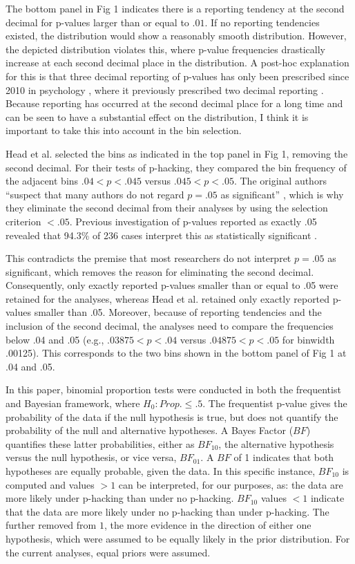 The bottom panel in Fig 1 indicates there is a reporting tendency at the second decimal for p-values larger than or equal to $.01$. If no reporting tendencies existed, the distribution would show a reasonably smooth distribution. However, the depicted distribution violates this, where p-value frequencies drastically increase at each second decimal place in the distribution. A post-hoc explanation for this is that three decimal reporting of p-values has only been prescribed since 2010 in psychology \cite{American_Psychological_Association2010-qe}, where it previously prescribed two decimal reporting \cite{American_Psychological_Association1983-yf, American_Psychological_Association2001-uw}. Because reporting has occurred at the second decimal place for a long time and can be seen to have a substantial effect on the distribution, I think it is important to take this into account in the bin selection.

Head et al. selected the bins as indicated in the top panel in Fig 1, removing the second decimal. For their tests of p-hacking, they compared the bin frequency of the adjacent bins $.04<p<.045$ versus $.045<p<.05$. The original authors “suspect that many authors do not regard $p=.05$ as significant” \cite{Head_2015}, which is why they eliminate the second decimal from their analyses by using the selection criterion $<.05$. Previous investigation of p-values reported as exactly .05 revealed that 94.3\% of 236 cases interpret this as statistically significant \cite{Nuijten2015}.

This contradicts the premise that most researchers do not interpret $p=.05$ as significant, which removes the reason for eliminating the second decimal. Consequently, only exactly reported p-values smaller than or equal to .05 were retained for the analyses, whereas Head et al. retained only exactly reported p-values smaller than .05. Moreover, because of reporting tendencies and the inclusion of the second decimal, the analyses need to compare the frequencies below .04 and .05 (e.g., $.03875<p<.04$ versus $.04875<p<.05$ for binwidth .00125). This corresponds to the two bins shown in the bottom panel of Fig 1 at .04 and .05.

In this paper, binomial proportion tests were conducted in both the frequentist and Bayesian framework, where $H_0:Prop.\leq.5$. The frequentist p-value gives the probability of the data if the null hypothesis is true, but does not quantify the probability of the null and alternative hypotheses. A Bayes Factor ($BF$) quantifies these latter probabilities, either as $BF_{10}$, the alternative hypothesis versus the null hypothesis, or vice versa, $BF_{01}$. A $BF$ of 1 indicates that both hypotheses are equally probable, given the data. In this specific instance, $BF_{10}$ is computed and values $>1$ can be interpreted, for our purposes, as: the data are more likely under p-hacking than under no p-hacking. $BF_{10}$ values $<1$ indicate that the data are more likely under no p-hacking than under p-hacking. The further removed from $1$, the more evidence in the direction of either one hypothesis, which were assumed to be equally likely in the prior distribution. For the current analyses, equal priors were assumed.

  
  
  
  